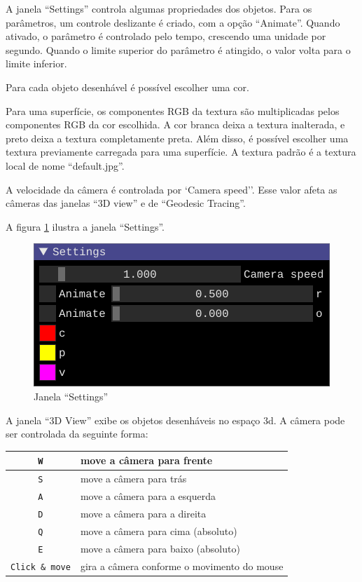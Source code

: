 A janela ``Settings'' controla algumas propriedades dos objetos.
Para os parâmetros, um controle deslizante é criado, com a opção ``Animate''.
Quando ativado, o parâmetro é controlado pelo tempo,
crescendo uma unidade por segundo.
Quando o limite superior do parâmetro é atingido,
o valor volta para o limite inferior.

Para cada objeto desenhável é possível escolher uma cor.

Para uma superfície, os componentes RGB da textura
são multiplicadas pelos componentes RGB da cor escolhida.
A cor branca deixa a textura inalterada,
e preto deixa a textura completamente preta.
Além disso, é possível escolher uma textura previamente carregada para
uma superfície. A textura padrão é a textura local de nome ``default.jpg''.

A velocidade da câmera é controlada por `Camera speed''.
Esse valor afeta as câmeras das janelas ``3D view'' e de ``Geodesic Tracing''.

A figura \ref{img:settings} ilustra a janela ``Settings''.

\begin{figure}[!ht]
    \includegraphics[width=\linewidth]{settings.png}
    \caption{Janela ``Settings''}
    \label{img:settings}
\end{figure}

A janela ``3D View'' exibe os objetos desenháveis no espaço 3d.
A câmera pode ser controlada da seguinte forma:

\begin{centering}
\begin{tabularx}{\textwidth}{||c|X||}
    \hline
    \texttt{W} & move a câmera para frente \\
    \hline
    \texttt{S} & move a câmera para trás \\
    \hline
    \texttt{A} & move a câmera para a esquerda \\
    \hline
    \texttt{D} & move a câmera para a direita \\
    \hline
    \texttt{Q} & move a câmera para cima (absoluto) \\
    \hline
    \texttt{E} & move a câmera para baixo (absoluto) \\
    \hline
    \texttt{Click \& move} & gira a câmera conforme o movimento do mouse \\
    \hline
\end{tabularx}
\end{centering}

